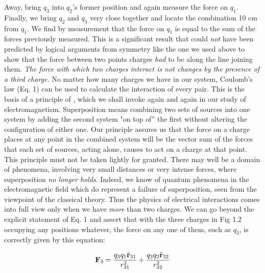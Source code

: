 Away, bring $q_3$ into $q_2$'s former position and again measure the
force on $q_1$. Finally, we bring $q_2$ and $q_3$ very close together
and locate the combination 10 cm from $q_1$. We find by measurement
that the force on $q_1$ is equal to the sum of the forces previously
measured. This is a significant result that could \emph{not} have
been predicted by logical arguments from symmetry like the one we
used above to show that the force between two points charges
\emph{had} to be along the line joining them. \emph{The force with
which two charges interact is not changes by the presence of a third
charge.} No matter how many charges we have in our system, Coulomb's
law (Eq. 1) can be used to calculate the interaction of every pair.
This is the basis of a principle of , which we
shall invoke again and again in our study of electromagnetism.
Superposition means combining two sets of sources into one system by
adding the second system "on top of'' the first without altering the
configuration of either one. Our principle assures us that the force
on a charge places at any point in the combined system will be the
vector sum of the forces that each set of sources, acting alone,
causes to act on a charge at that point. This principle must not be
taken lightly for granted. There may well be a domain of phenomena,
involving very small distances or very intense forces, where
superposition \emph{no longer holds}.  Indeed, we know of quantum
phenomena in the electromagnetic field which do represent a failure
of superposition, seen from the viewpoint of the classical theory.
Thus the physics of electrical interactions comes into full view only
when we have \emph{more} than two charges. We can go beyond the
explicit statement of Eq. 1 and assert that with the three charges in
Fig 1.2 occupying any positions whatever, the force on any one of
them, such as $q_3$, is correctly given by this equation: 

\begin{equation}
\mathbf{F}_3= \frac{q_3q_1\hat{\mathbf{r}}_{31}}{r_{31}^2}+\frac{q_3q_2\hat{\mathbf{r}}_{32}}{r_{32}^2}
\end{equation}

